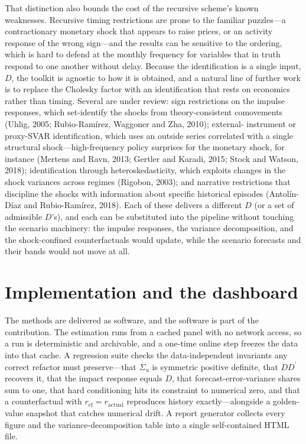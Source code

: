 \documentclass[11pt]{article}
\newcommand{\tp}{^{\prime}}
\theoremstyle{remark}
\begin{document}
That distinction also bounds the cost of the recursive scheme's known weaknesses.
Recursive timing restrictions are prone to the familiar puzzles---a
contractionary monetary shock that appears to raise prices, or an activity
response of the wrong sign---and the results can be sensitive to the ordering,
which is hard to defend at the monthly frequency for variables that in truth
respond to one another without delay. Because the identification is a single
input, $D$, the toolkit is agnostic to how it is obtained, and a natural line of
further work is to replace the Cholesky factor with an identification that rests
on economics rather than timing. Several are under review: sign restrictions on
the impulse responses, which set-identify the shocks from theory-consistent
comovements (Uhlig, 2005; Rubio-Ram\'irez, Waggoner and Zha, 2010); external-
instrument or proxy-SVAR identification, which uses an outside series correlated
with a single structural shock---high-frequency policy surprises for the monetary
shock, for instance (Mertens and Ravn, 2013; Gertler and Karadi, 2015; Stock and
Watson, 2018); identification through heteroskedasticity, which exploits changes
in the shock variances across regimes (Rigobon, 2003); and narrative restrictions
that discipline the shocks with information about specific historical episodes
(Antol\'in-D\'iaz and Rubio-Ram\'irez, 2018). Each of these delivers a different
$D$ (or a set of admissible $D$'s), and each can be substituted into the pipeline
without touching the scenario machinery: the impulse responses, the variance
decomposition, and the shock-confined counterfactuals would update, while the
scenario forecasts and their bands would not move at all.

\section{Implementation and the dashboard}\label{sec:tooling}
The methods are delivered as software, and the software is part of the
contribution. The estimation runs from a cached panel with no network access, so a
run is deterministic and archivable, and a one-time online step freezes the data
into that cache. A regression suite checks the data-independent invariants any
correct refactor must preserve---that $\Sigma_u$ is symmetric positive definite,
that $DD\tp$ recovers it, that the impact response equals $D$, that
forecast-error-variance shares sum to one, that hard conditioning hits its
constraint to numerical zero, and that a counterfactual with
$r_{\text{cf}}=r_{\text{actual}}$ reproduces history exactly---alongside a
golden-value snapshot that catches numerical drift. A report generator collects
every figure and the variance-decomposition table into a single self-contained
HTML file.
\end{document}

